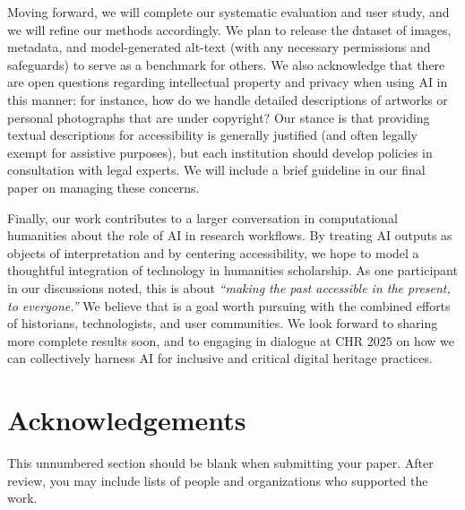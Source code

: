 \documentclass{anthology-ch}         %
\begin{document}
Moving forward, we will complete our systematic evaluation and user study, and we will refine our methods accordingly. We plan to release the dataset of images, metadata, and model-generated alt-text (with any necessary permissions and safeguards) to serve as a benchmark for others. We also acknowledge that there are open questions regarding intellectual property and privacy when using AI in this manner: for instance, how do we handle detailed descriptions of artworks or personal photographs that are under copyright? Our stance is that providing textual descriptions for accessibility is generally justified (and often legally exempt for assistive purposes), but each institution should develop policies in consultation with legal experts. We will include a brief guideline in our final paper on managing these concerns.

Finally, our work contributes to a larger conversation in computational humanities about the role of AI in research workflows. By treating AI outputs as objects of interpretation and by centering accessibility, we hope to model a thoughtful integration of technology in humanities scholarship. As one participant in our discussions noted, this is about \emph{``making the past accessible in the present, to everyone.''} We believe that is a goal worth pursuing with the combined efforts of historians, technologists, and user communities. We look forward to sharing more complete results soon, and to engaging in dialogue at CHR 2025 on how we can collectively harness AI for inclusive and critical digital heritage practices.


\section*{Acknowledgements}

This unnumbered section should be blank when submitting your paper. After review, you may include lists of people and organizations who supported the work.

\printbibliography



\end{document}
